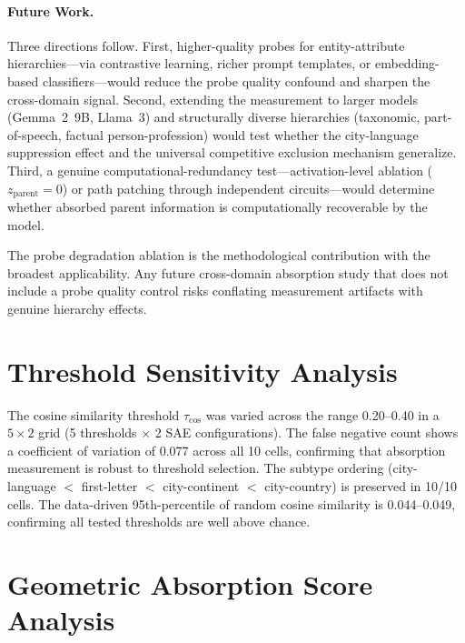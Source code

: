 \documentclass{article}
\begin{document}
\paragraph{Future Work.}
Three directions follow. First, higher-quality probes for entity-attribute hierarchies---via contrastive learning, richer prompt templates, or embedding-based classifiers---would reduce the probe quality confound and sharpen the cross-domain signal. Second, extending the measurement to larger models (Gemma~2~9B, Llama~3) and structurally diverse hierarchies (taxonomic, part-of-speech, factual person-profession) would test whether the city-language suppression effect and the universal competitive exclusion mechanism generalize. Third, a genuine computational-redundancy test---activation-level ablation ($z_{\text{parent}} = 0$) or path patching through independent circuits---would determine whether absorbed parent information is computationally recoverable by the model.

The probe degradation ablation is the methodological contribution with the broadest applicability. Any future cross-domain absorption study that does not include a probe quality control risks conflating measurement artifacts with genuine hierarchy effects.




\appendix

\section{Threshold Sensitivity Analysis}
\label{app:threshold}

The cosine similarity threshold $\tau_{\cos}$ was varied across the range 0.20--0.40 in a $5 \times 2$ grid (5 thresholds $\times$ 2 SAE configurations). The false negative count shows a coefficient of variation of 0.077 across all 10 cells, confirming that absorption measurement is robust to threshold selection. The subtype ordering (city-language $<$ first-letter $<$ city-continent $<$ city-country) is preserved in 10/10 cells. The data-driven 95th-percentile of random cosine similarity is 0.044--0.049, confirming all tested thresholds are well above chance.

\section{Geometric Absorption Score Analysis}
\label{app:gas}
\end{document}
